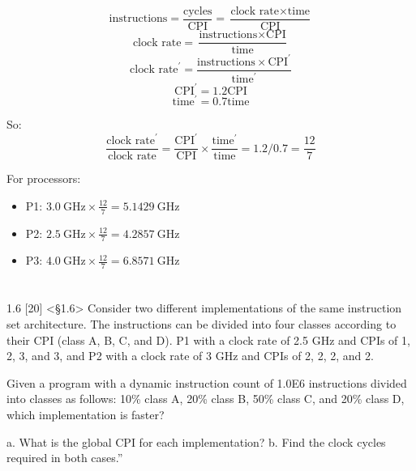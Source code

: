 \documentclass[paper=a4, fontsize=11pt]{scrartcl} %
\begin{document}
\begin{enumerate}
  $$\text{instructions} = \frac{\text{cycles}}{\text{CPI}}
  = \frac{\text{clock rate}\times\text{time}}{\text{CPI}}$$
  $$\text{clock rate}
  = \frac{\text{instructions}\times\text{CPI}}{\text{time}}$$
  $$\text{clock rate}^{\prime}
  = \frac{\text{instructions}\times\text{CPI}^{\prime}}{\text{time}^{\prime}}$$
  $$\text{CPI}^{\prime} = 1.2\text{CPI}$$
  $$\text{time}^{\prime} = 0.7\text{time}$$

  So:
  $$\frac{\text{clock rate}^{\prime}}{\text{clock rate}}
  = \frac{\text{CPI}^{\prime}}{\text{CPI}}\times
  \frac{\text{time}^{\prime}}{\text{time}}
  = 1.2 / 0.7 = \frac{12}{7}$$

  For processors:
  \begin{itemize}
  \item{P1:} $\SI{3.0}{\giga\hertz}\times\frac{12}{7} =
    \SI{5.1429}{\giga\hertz}$
  \item{P2:} $\SI{2.5}{\giga\hertz}\times\frac{12}{7} =
    \SI{4.2857}{\giga\hertz}$
  \item{P3:} $\SI{4.0}{\giga\hertz}\times\frac{12}{7} =
    \SI{6.8571}{\giga\hertz}$
  \end{itemize}

\end{enumerate}


\pagebreak

\section{}

\begin{fancyquotes}
  1.6 [20] <§1.6> Consider two different implementations of the same
  instruction set architecture. The instructions can be divided into
  four classes according to their CPI (class A, B, C, and D). P1 with
  a clock rate of 2.5 GHz and CPIs of 1, 2, 3, and 3, and P2 with a
  clock rate of 3 GHz and CPIs of 2, 2, 2, and 2.

  Given a program with a dynamic instruction count of 1.0E6
  instructions divided into classes as follows: 10\% class A, 20\%
  class B, 50\% class C, and 20\% class D, which implementation is
  faster?

  a. What is the global CPI for each implementation?
  b. Find the clock cycles required in both cases.”
\end{fancyquotes}
\end{document}
